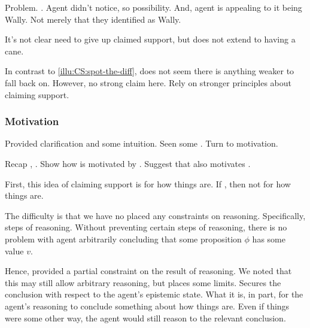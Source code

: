 \begin{note}
  Problem.
  \requ{}.
  Agent didn't notice, so possibility.
  And, agent is appealing to it being Wally.
  Not merely that they identified as Wally.

  It's not clear need to give up claimed support, but does not extend to having a cane.

  In contrast to \ref{illu:CS:spot-the-diff}, does not seem there is anything weaker to fall back on.
  However, no strong claim here.
  Rely on stronger principles about claiming support.
\end{note}

\subsubsection{Motivation}
\label{sec:motivation}

\begin{note}
  Provided clarification and some intuition.
  Seen some .
  Turn to motivation.

  Recap \ideaS{}, \support{}.
  Show how \ideaCS{} is motivated by \ideaS{}.
  Suggest that \ideaCS{} also motivates \ideaS{}.
\end{note}

\begin{note}
  First, this idea of claiming support is for how things are.
  If \epVW{}, then not for how things are.

  The difficulty is that we have no placed any constraints on reasoning.
  Specifically, steps of reasoning.
  Without preventing certain steps of reasoning, there is no problem with agent arbitrarily concluding that some proposition \(\phi\) has some value \(v\).

  Hence, \ideaS{} provided a partial constraint on the result of reasoning.
  We noted that this may still allow arbitrary reasoning, but \ideaS{} places some limits.
  Secures the conclusion with respect to the agent's epistemic state.
  What it is, in part, for the agent's reasoning to conclude something about how things are.
  Even if things were some other way, the agent would still reason to the relevant conclusion.
\end{note}


